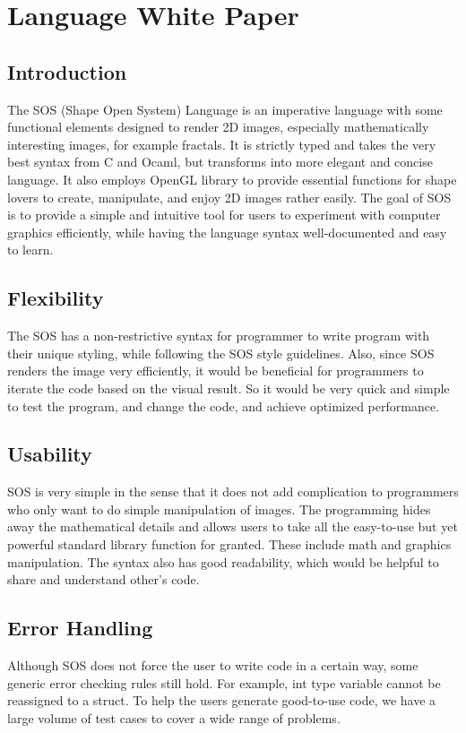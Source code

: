 \documentclass[main.tex]{subfiles}
\begin{document}
	\section{Language White Paper}
	\subsection{Introduction}

The SOS (Shape Open System) Language is an imperative language with some
functional elements designed to render 2D images, especially mathematically interesting images, for example fractals. It is strictly typed and takes the very best syntax from C and Ocaml, but transforms into more elegant and concise language. It also employs OpenGL library to provide essential functions for shape lovers to create, manipulate, and enjoy 2D images rather easily. The goal of SOS is to provide a simple and intuitive tool for users to experiment with computer graphics efficiently, while having the language syntax well-documented and easy to learn.

	
	\subsection{Flexibility}
	The SOS has a non-restrictive syntax for programmer to write program with their unique styling, while following the SOS style guidelines. Also, since SOS renders the image very efficiently, it would be beneficial for programmers to iterate the code based on the visual result. So it would be very quick and simple to test the program, and change the code, and achieve optimized performance.

	
	\subsection{Usability}
	SOS is very simple in the sense that it does not add complication to programmers who only want to do simple manipulation of images. The programming hides away the mathematical details and allows users to take all the easy-to-use but yet powerful standard library function for granted. These include math and graphics manipulation. The syntax also has good readability, which would be helpful to share and understand other's code.
	
	
	\subsection{Error Handling}
	Although SOS does not force the user to write code in a certain way, some generic error checking rules still hold. For example, int type variable cannot be reassigned to a struct. To help the users generate good-to-use code, we have a large volume of test cases to cover a wide range of problems.
	
\end{document}
